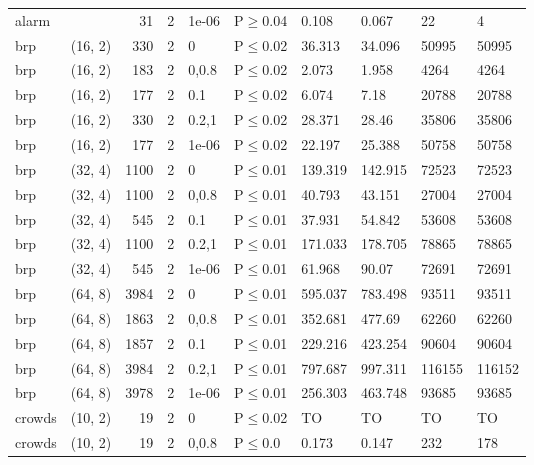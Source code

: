 \begin{longtable}{llrrllllll}
 alarm         &           &     	31 &   2 & 1e-06 & P$\geq$0.04  & 0.108   & 0.067    & 22     & 4      \\
 brp           & (16, 2)   &    	330 &   2 & 0     & P$\leq$0.02  & 36.313  & 34.096   & 50995  & 50995  \\
 brp           & (16, 2)   &    	183 &   2 & 0,0.8 & P$\leq$0.02  & 2.073   & 1.958    & 4264   & 4264   \\
 brp           & (16, 2)   &    	177 &   2 & 0.1   & P$\leq$0.02  & 6.074   & 7.18     & 20788  & 20788  \\
 brp           & (16, 2)   &    	330 &   2 & 0.2,1 & P$\leq$0.02  & 28.371  & 28.46    & 35806  & 35806  \\
 brp           & (16, 2)   &    	177 &   2 & 1e-06 & P$\leq$0.02  & 22.197  & 25.388   & 50758  & 50758  \\
 brp           & (32, 4)   &   	1100 &   2 & 0     & P$\leq$0.01  & 139.319 & 142.915  & 72523  & 72523  \\
 brp           & (32, 4)   &   	1100 &   2 & 0,0.8 & P$\leq$0.01  & 40.793  & 43.151   & 27004  & 27004  \\
 brp           & (32, 4)   &    	545 &   2 & 0.1   & P$\leq$0.01  & 37.931  & 54.842   & 53608  & 53608  \\
 brp           & (32, 4)   &   	1100 &   2 & 0.2,1 & P$\leq$0.01  & 171.033 & 178.705  & 78865  & 78865  \\
 brp           & (32, 4)   &    	545 &   2 & 1e-06 & P$\leq$0.01  & 61.968  & 90.07    & 72691  & 72691  \\
 brp           & (64, 8)   &   	3984 &   2 & 0     & P$\leq$0.01  & 595.037 & 783.498  & 93511  & 93511  \\
 brp           & (64, 8)   &   	1863 &   2 & 0,0.8 & P$\leq$0.01  & 352.681 & 477.69   & 62260  & 62260  \\
 brp           & (64, 8)   &   	1857 &   2 & 0.1   & P$\leq$0.01  & 229.216 & 423.254  & 90604  & 90604  \\
 brp           & (64, 8)   &   	3984 &   2 & 0.2,1 & P$\leq$0.01  & 797.687 & 997.311  & 116155 & 116152 \\
 brp           & (64, 8)   &   	3978 &   2 & 1e-06 & P$\leq$0.01  & 256.303 & 463.748  & 93685  & 93685  \\
 crowds        & (10, 2)   &     	19 &   2 & 0     & P$\leq$0.02  & TO      & TO       & TO     & TO     \\
 crowds        & (10, 2)   &     	19 &   2 & 0,0.8 & P$\leq$0.0   & 0.173   & 0.147    & 232    & 178    \\

\end{longtable}
